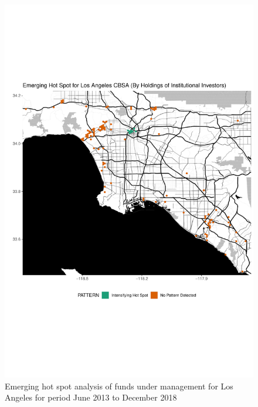 \begin{figure}
	\centering
	\includegraphics[width=1\linewidth]{Figures/ChapterIV/LA_Money_EH}
	\caption[Emerging Hot Spot Analysis of Funds Under Management for Los Angeles CBSA 2013-2018]{Emerging hot spot analysis of funds under management for Los Angeles for period June 2013 to December 2018}
	\label{fig:LAmoneyhotspot}
\end{figure}

